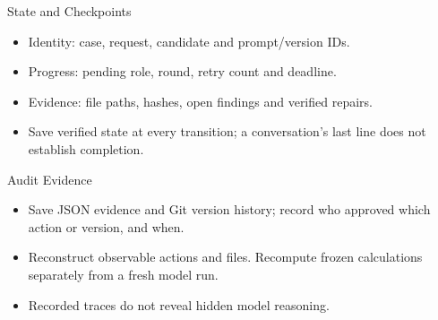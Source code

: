 \begin{frame}{State and Checkpoints}
\begin{center}
\resizebox{.82\textwidth}{!}{}
\end{center}
\begin{itemize}
\item Identity: case, request, candidate and prompt/version IDs.
\item Progress: pending role, round, retry count and deadline.
\item Evidence: file paths, hashes, open findings and verified repairs.
\item Save verified state at every transition; a conversation's last line does not establish completion.
\end{itemize}
\end{frame}

\begin{frame}{Audit Evidence}
\begin{center}
\resizebox{.94\textwidth}{!}{}
\end{center}
\begin{itemize}
\item Save JSON evidence and Git version history; record who approved which action or version, and when.
\item Reconstruct observable actions and files. Recompute frozen calculations separately from a fresh model run.
\item Recorded traces do not reveal hidden model reasoning.
\end{itemize}
\end{frame}
